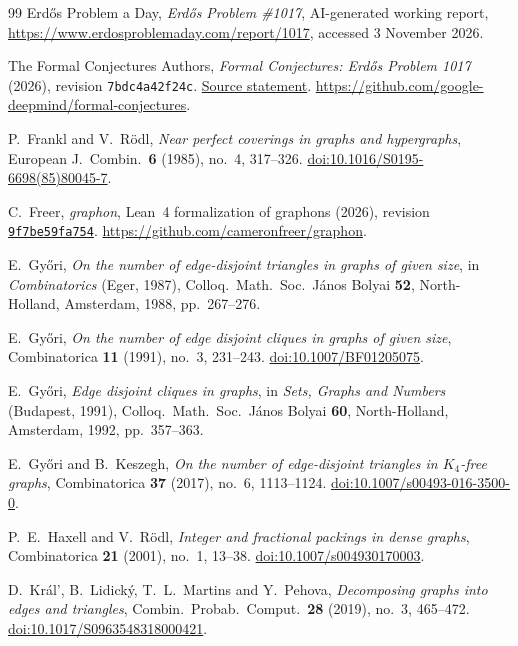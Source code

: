 \documentclass[10pt]{article}
\theoremstyle{definition}
\theoremstyle{remark}
\numberwithin{equation}{section}
\begin{document}
\begin{thebibliography}{99}
Erd\H{o}s Problem a Day, \emph{Erd\H{o}s Problem \#1017}, AI-generated working report, \url{https://www.erdosproblemaday.com/report/1017}, accessed 3 November 2026.

The Formal Conjectures Authors, \emph{Formal Conjectures: Erd\H{o}s Problem 1017} (2026), revision \texttt{7bdc4a42f24c}. \href{https://github.com/google-deepmind/formal-conjectures/blob/7bdc4a42f24c0316f81c73b26121794b2bed96a3/FormalConjectures/ErdosProblems/1017.lean}{Source statement}. \url{https://github.com/google-deepmind/formal-conjectures}.

P.~Frankl and V.~R\"odl, \emph{Near perfect coverings in graphs and hypergraphs}, European J.\ Combin.\ \textbf{6} (1985), no.~4, 317--326. \href{https://doi.org/10.1016/S0195-6698(85)80045-7}{doi:10.1016/S0195-6698(85)80045-7}.

C.~Freer, \emph{graphon}, Lean~4 formalization of graphons (2026), revision \href{https://github.com/cameronfreer/graphon/tree/9f7be59fa754d260a544b4cfd83d6a5b94f7552e}{\texttt{9f7be59fa754}}. \url{https://github.com/cameronfreer/graphon}.

E.~Gy\H{o}ri, \emph{On the number of edge-disjoint triangles in graphs of given size}, in \emph{Combinatorics} (Eger, 1987), Colloq.\ Math.\ Soc.\ J\'anos Bolyai \textbf{52}, North-Holland, Amsterdam, 1988, pp.~267--276.

E.~Gy\H{o}ri, \emph{On the number of edge disjoint cliques in graphs of given size}, Combinatorica \textbf{11} (1991), no.~3, 231--243. \href{https://doi.org/10.1007/BF01205075}{doi:10.1007/BF01205075}.

E.~Gy\H{o}ri, \emph{Edge disjoint cliques in graphs}, in \emph{Sets, Graphs and Numbers} (Budapest, 1991), Colloq.\ Math.\ Soc.\ J\'anos Bolyai \textbf{60}, North-Holland, Amsterdam, 1992, pp.~357--363.

E.~Gy\H{o}ri and B.~Keszegh, \emph{On the number of edge-disjoint triangles in $K_4$-free graphs}, Combinatorica \textbf{37} (2017), no.~6, 1113--1124. \href{https://doi.org/10.1007/s00493-016-3500-0}{doi:10.1007/s00493-016-3500-0}.

P.~E.~Haxell and V.~R\"odl, \emph{Integer and fractional packings in dense graphs}, Combinatorica \textbf{21} (2001), no.~1, 13--38. \href{https://doi.org/10.1007/s004930170003}{doi:10.1007/s004930170003}.

D.~Kr\'al', B.~Lidick\'y, T.~L.~Martins and Y.~Pehova, \emph{Decomposing graphs into edges and triangles}, Combin.\ Probab.\ Comput.\ \textbf{28} (2019), no.~3, 465--472. \href{https://doi.org/10.1017/S0963548318000421}{doi:10.1017/S0963548318000421}.


\end{thebibliography}
\end{document}
